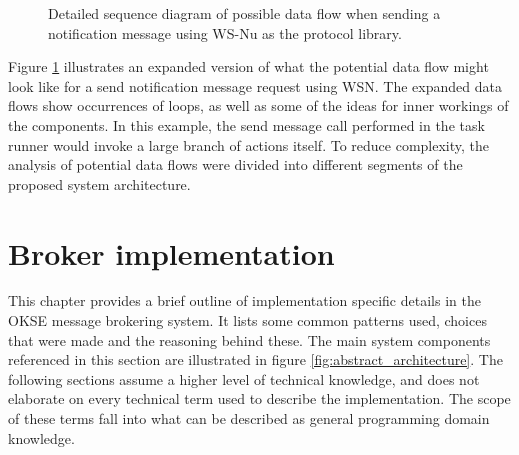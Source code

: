 \clearpage

\begin{center}
  \begin{figure}[ht!]
    \caption{Detailed sequence diagram of possible data flow when sending a notification message using WS-Nu as the protocol library.}
    \label{fig:architecture_data_flow}
  \end{figure}
\end{center}
Figure \ref{fig:architecture_data_flow} illustrates an expanded version of what the potential data flow might look like for a send notification message request using WSN. The expanded data flows show occurrences of loops, as well as some of the ideas for inner workings of the components. In this example, the send message call performed in the task runner would invoke a large branch of actions itself. To reduce complexity, the analysis of potential data flows were divided into different segments of the proposed system architecture.


\section{Broker implementation}
\label{sec:architecture_and_implementation-implementation}

This chapter provides a brief outline of implementation specific details in the OKSE message brokering system. It lists some common patterns used, choices that were made and the reasoning behind these. The main system components referenced in this section are illustrated in figure \ref{fig:abstract_architecture}. The following sections assume a higher level of technical knowledge, and does not elaborate on every technical term used to describe the implementation. The scope of these terms fall into what can be described as general programming domain knowledge.

